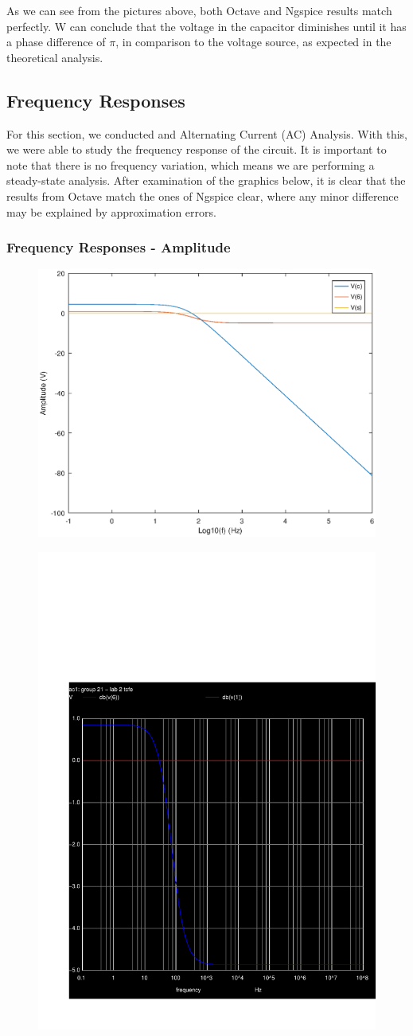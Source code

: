 As we can see from the pictures above, both Octave and Ngspice results match perfectly. W can conclude that the voltage in the capacitor diminishes until it has a phase difference of $\pi$, in comparison to the voltage source, as expected in the theoretical analysis.

\subsection{Frequency Responses}

For this section, we conducted and Alternating Current (AC) Analysis. With this, we were able to study the frequency response of the circuit. It is important to note that there is no frequency variation, which means we are performing a steady-state analysis. After examination of the graphics below, it is clear that the results from Octave match the ones of Ngspice clear, where any minor difference may be explained by approximation errors.

\subsubsection{Frequency Responses - Amplitude}

\begin{figure}
\centering
\begin{minipage}{.5\textwidth}
  \centering
  \includegraphics[width=.4\linewidth]{amplitude.eps}
  \label{fig:test1}
\end{minipage}%
\begin{minipage}{.5\textwidth}
  \centering
  \includegraphics[width=.4\linewidth]{question5_db.pdf}
  \label{fig:test2}
\end{minipage}
\end{figure}


